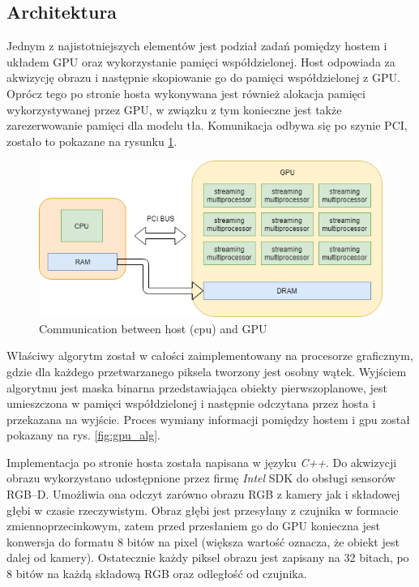 \documentclass[b5paper,10pt,twoside]{article}
\begin{document}
{%

\subsection{Architektura}
\label{subsec:architecture}

Jednym z najistotniejszych elementów jest podział zadań pomiędzy hostem i układem GPU oraz wykorzystanie pamięci współdzielonej. Host odpowiada za akwizycję obrazu i następnie skopiowanie go do pamięci współdzielonej z GPU. Oprócz tego po stronie hosta wykonywana jest również alokacja pamięci wykorzystywanej przez GPU, w związku z tym konieczne jest także zarezerwowanie pamięci dla modelu tła. Komunikacja odbywa się po szynie PCI, zostało to pokazane na rysunku \ref{fig:cpu_host}. 


\begin{figure}[!t]
	\begin{center}
		\includegraphics[scale=0.50]{img/cpu_host.png}
		\caption{Communication between host (cpu) and GPU}
		\label{fig:cpu_host}
	\end{center}
\end{figure}

Właściwy algorytm został w całości zaimplementowany na procesorze graficznym, gdzie dla każdego przetwarzanego piksela tworzony jest osobny wątek. Wyjściem algorytmu jest maska binarna przedstawiająca obiekty pierwszoplanowe, jest umieszczona w pamięci współdzielonej i następnie odczytana przez hosta i przekazana na wyjście. Proces wymiany informacji pomiędzy hostem i gpu został pokazany na rys. \ref{fig:gpu_alg}.

Implementacja po stronie hosta została napisana w języku \textit{C++}. Do akwizycji obrazu wykorzystano udostępnione przez firmę \textit{Intel} SDK do obsługi sensorów RGB--D. Umożliwia ona odczyt zarówno obrazu RGB z kamery  jak i składowej głębi w czasie rzeczywistym. Obraz głębi jest przesyłany z czujnika w formacie zmiennoprzecinkowym, zatem przed przesłaniem go do GPU konieczna jest konwersja do formatu 8 bitów na pixel (większa wartość oznacza, że obiekt jest dalej od kamery). Ostatecznie każdy piksel obrazu jest zapisany na 32 bitach, po 8 bitów na każdą składową RGB oraz odległość od czujnika. 

}
\end{document}
